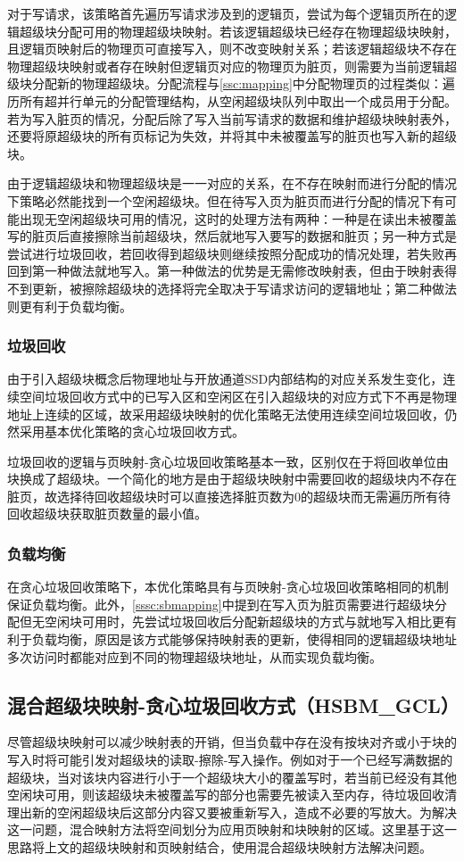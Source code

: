 对于写请求，该策略首先遍历写请求涉及到的逻辑页，尝试为每个逻辑页所在的逻辑超级块分配可用的物理超级块映射。若该逻辑超级块已经存在物理超级块映射，且逻辑页映射后的物理页可直接写入，则不改变映射关系；若该逻辑超级块不存在物理超级块映射或者存在映射但逻辑页对应的物理页为脏页，则需要为当前逻辑超级块分配新的物理超级块。分配流程与\ref{ssc:mapping}中分配物理页的过程类似：遍历所有超并行单元的分配管理结构，从空闲超级块队列中取出一个成员用于分配。若为写入脏页的情况，分配后除了写入当前写请求的数据和维护超级块映射表外，还要将原超级块的所有页标记为失效，并将其中未被覆盖写的脏页也写入新的超级块。

由于逻辑超级块和物理超级块是一一对应的关系，在不存在映射而进行分配的情况下策略必然能找到一个空闲超级块。但在待写入页为脏页而进行分配的情况下有可能出现无空闲超级块可用的情况，这时的处理方法有两种：一种是在读出未被覆盖写的脏页后直接擦除当前超级块，然后就地写入要写的数据和脏页；另一种方式是尝试进行垃圾回收，若回收得到超级块则继续按照分配成功的情况处理，若失败再回到第一种做法就地写入。第一种做法的优势是无需修改映射表，但由于映射表得不到更新，被擦除超级块的选择将完全取决于写请求访问的逻辑地址；第二种做法则更有利于负载均衡。

\subsubsection{垃圾回收}
由于引入超级块概念后物理地址与开放通道SSD内部结构的对应关系发生变化，连续空间垃圾回收方式中的已写入区和空闲区在引入超级块的对应方式下不再是物理地址上连续的区域，故采用超级块映射的优化策略无法使用连续空间垃圾回收，仍然采用基本优化策略的贪心垃圾回收方式。

垃圾回收的逻辑与页映射-贪心垃圾回收策略基本一致，区别仅在于将回收单位由块换成了超级块。一个简化的地方是由于超级块映射中需要回收的超级块内不存在脏页，故选择待回收超级块时可以直接选择脏页数为0的超级块而无需遍历所有待回收超级块获取脏页数量的最小值。

\subsubsection{负载均衡}
在贪心垃圾回收策略下，本优化策略具有与页映射-贪心垃圾回收策略相同的机制保证负载均衡。此外，\ref{sssc:sbmapping}中提到在写入页为脏页需要进行超级块分配但无空闲块可用时，先尝试垃圾回收后分配新超级块的方式与就地写入相比更有利于负载均衡，原因是该方式能够保持映射表的更新，使得相同的逻辑超级块地址多次访问时都能对应到不同的物理超级块地址，从而实现负载均衡。

\subsection{混合超级块映射-贪心垃圾回收方式（HSBM\_GCL）}
尽管超级块映射可以减少映射表的开销，但当负载中存在没有按块对齐或小于块的写入时将可能引发对超级块的读取-擦除-写入操作。例如对于一个已经写满数据的超级块，当对该块内容进行小于一个超级块大小的覆盖写时，若当前已经没有其他空闲块可用，则该超级块未被覆盖写的部分也需要先被读入至内存，待垃圾回收清理出新的空闲超级块后这部分内容又要被重新写入，造成不必要的写放大。为解决这一问题，混合映射方法\cite{park_reconfigurable_2008}将空间划分为应用页映射和块映射的区域。这里基于这一思路将上文的超级块映射和页映射结合，使用混合超级块映射方法解决问题。
